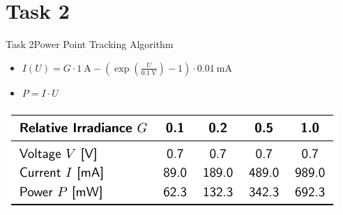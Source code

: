 
\section{Task 2}

\setcounter{task}{1}

\begin{frame}[allowframebreaks]{Task 2}{Power Point Tracking Algorithm}
  \begin{requirementsnoinc}
    \begin{itemize}
      \item $I(U)=G \cdot 1 \mathrm{~A}-\left(\exp \left(\frac{U}{0.1 \mathrm{~V}}\right)-1\right) \cdot 0.01 \mathrm{~mA}$
      \item $P = I \cdot U$
    \end{itemize}
  \end{requirementsnoinc}
  \begin{solution}
    \includegraphics[width=\textwidth]{./figures/task2_sol1.png}
  \end{solution}
\end{frame}

